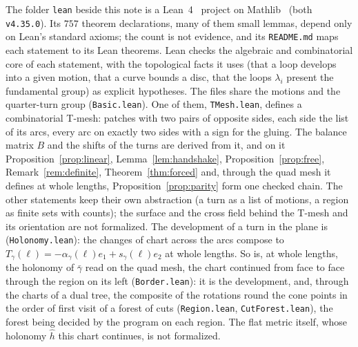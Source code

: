 \documentclass[11pt,a4paper]{article}
\newcommand{\shift}{s}
\begin{document}
The folder \texttt{lean} beside this note is a Lean~4~\cite{demoura2021lean4}
project on Mathlib~\cite{mathlib2020} (both \texttt{v4.35.0}). Its $757$
theorem declarations, many of them small lemmas, depend only on Lean's
standard axioms; the count is not evidence, and its \texttt{README.md} maps
each statement to its Lean theorems. Lean checks the algebraic and
combinatorial core of each statement, with the topological facts it uses
(that a loop develops into a given motion, that a curve bounds a disc, that
the loops $\lambda_i$ present the fundamental group) as explicit hypotheses. The files share the motions and
the quarter-turn group (\texttt{Basic.lean}). One of them,
\texttt{TMesh.lean}, defines a combinatorial T-mesh: patches with two pairs of
opposite sides, each side the list of its arcs, every arc on exactly two sides
with a sign for the gluing. The balance matrix $B$ and the shifts of the turns
are derived from it, and on it Proposition~\ref{prop:linear},
Lemma~\ref{lem:handshake}, Proposition~\ref{prop:free},
Remark~\ref{rem:definite}, Theorem~\ref{thm:forced} and, through the quad
mesh it defines at whole lengths, Proposition~\ref{prop:parity} form one
checked chain. The other statements keep their own abstraction (a turn as a list of
motions, a region as finite sets with counts); the surface and the cross field
behind the T-mesh and its orientation are not formalized. The development of
a turn in the plane is (\texttt{Holonomy.lean}): the changes of chart across
the arcs compose to $T_\gamma(\ell) = -\alpha_\gamma(\ell) e_1 +
\shift_\gamma(\ell) e_2$ at whole lengths. So is, at whole lengths, the
holonomy of $\bar\gamma$ read on the quad mesh, the chart continued from face
to face through the region on its left (\texttt{Border.lean}): it is the
development, and, through the charts of a dual tree, the composite of the
rotations round the cone points in the order of first visit of a forest of
cuts (\texttt{Region.lean}, \texttt{CutForest.lean}), the forest being
decided by the program on each region. The flat metric itself, whose holonomy
$\hat h$ this chart continues, is not formalized.
\end{document}
